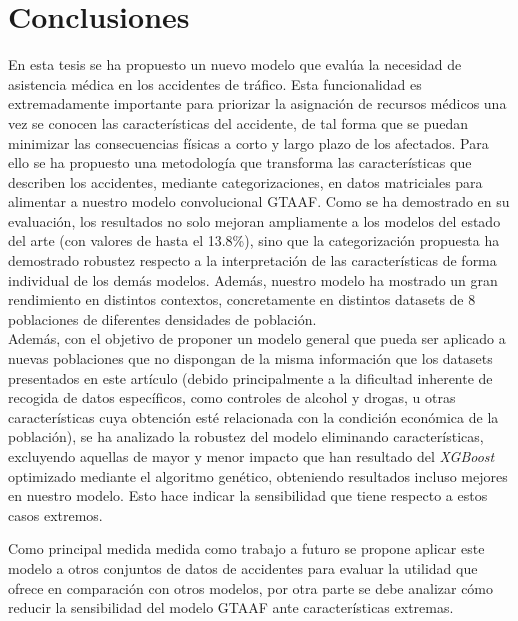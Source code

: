 \chapter{Conclusiones}


En esta tesis se ha propuesto un nuevo modelo que evalúa la necesidad de asistencia médica en los accidentes de tráfico. Esta funcionalidad es extremadamente importante para priorizar la asignación de recursos médicos una vez se conocen las características del accidente, de tal forma que se puedan minimizar las consecuencias físicas a corto y largo plazo de los afectados. Para ello se ha propuesto una metodología que transforma las características que describen los accidentes, mediante categorizaciones, en datos matriciales para alimentar a nuestro modelo convolucional GTAAF. Como se ha demostrado en su evaluación, los resultados no solo mejoran ampliamente a los modelos del estado del arte (con valores de hasta el 13.8\%), sino que la categorización propuesta ha demostrado robustez respecto a la interpretación de las características de forma individual de los demás modelos. Además, nuestro modelo ha mostrado un gran rendimiento en distintos contextos, concretamente en  distintos datasets de 8 poblaciones de diferentes densidades de población.\\

Además, con el objetivo de proponer un modelo general que pueda ser aplicado a nuevas poblaciones que no dispongan de la misma información que los datasets presentados en este artículo (debido principalmente a la dificultad inherente de recogida de datos específicos, como controles de alcohol y drogas, u otras características cuya obtención esté relacionada con la condición económica de la población), se ha analizado la robustez del modelo eliminando características, excluyendo aquellas de mayor y menor impacto que han resultado del \textit{XGBoost} optimizado mediante el algoritmo genético, obteniendo resultados incluso mejores en nuestro modelo. Esto hace indicar la sensibilidad que tiene respecto a estos casos extremos.

Como principal medida medida como trabajo a futuro se propone aplicar este modelo a otros conjuntos de datos de accidentes para evaluar la utilidad que ofrece en comparación con otros modelos, por otra parte se debe analizar cómo reducir la sensibilidad del modelo GTAAF ante características extremas.
